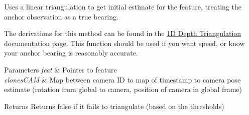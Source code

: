 Uses a linear triangulation to get initial estimate for the feature, treating the anchor observation as a true bearing. 

The derivations for this method can be found in the \hyperlink{update-featinit_featinit-linear-1d}{1D Depth Triangulation} documentation page. This function should be used if you want speed, or know your anchor bearing is reasonably accurate.


\begin{DoxyParams}{Parameters}
{\em feat} & Pointer to feature \\
\hline
{\em clones\+C\+AM} & Map between camera ID to map of timestamp to camera pose estimate (rotation from global to camera, position of camera in global frame) \\
\hline
\end{DoxyParams}
\begin{DoxyReturn}{Returns}
Returns false if it fails to triangulate (based on the thresholds) 
\end{DoxyReturn}
